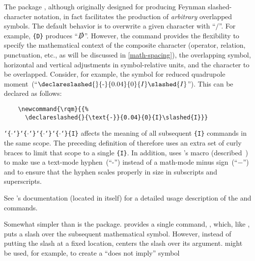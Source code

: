  
The  package \citep{slashed}, although originally designed for
producing Feynman
slashed-character notation, in fact
facilitates the production of \emph{arbitrary} overlapped symbols.
\ifhaveslashed
  \newcommand{\rqm}{{\declareslashed{}{\text{-}}{0.04}{0}{I}\slashed{I}}}
  The default behavior is to overwrite a given character with ``$/$''.
  For example, \cmd{\slashed}\verb|{D}| produces ``$\slashed{D}$''.
  However, the \cmd{\declareslashed} command provides the flexibility
  to specify the mathematical context of the composite character
  (operator, relation, punctuation, etc., as will be discussed in
  \ref{math-spacing}), the overlapping symbol, horizontal and
  vertical adjustments in symbol-relative units, and the character to
  be overlapped.  Consider, for example, the symbol for reduced
  quadrupole moment~(``$\rqm$'').  This can be declared as follows:

\begin{verbatim}
    \newcommand{\rqm}{{%
      \declareslashed{}{\text{-}}{0.04}{0}{I}\slashed{I}}}
\end{verbatim}

  \noindent
  \newcommand{\curlyarg}{\texttt{\char`\{}$\cdot$\texttt{\char`\}}}%

  \cmd{\declareslashed}\curlyarg\curlyarg\curlyarg\curlyarg\verb|{I}|
  affects the meaning of all subsequent \cmd{\slashed}\verb|{I}|
  commands in the same scope.  The preceding definition of 
  therefore uses an extra set of curly braces to limit that scope to a
  single \cmd{\slashed}\verb|{I}|.  In addition,  uses
  's \cmd{\text} macro
  (described~) to make
  \cmd{\declareslashed} use a text-mode hyphen~(``-'') instead of a
  math-mode minus sign~(``$-$'') and to ensure that the hyphen scales
  properly in size in subscripts and superscripts.
\fi  

See 's documentation (located in
 itself) for a detailed usage description of the
\cmd{\slashed} and \cmd{\declareslashed} commands.

Somewhat simpler than  is the 
package.   provides a single command,
\cmd{\centernot}, which, like \cmd{\not}, puts a slash over the
subsequent mathematical symbol.  However, instead of putting the slash
at a fixed location, \cmd{\centernot} centers the slash over its
argument.  \cmd{\centernot} might be used, for example, to create a
``does not imply'' symbol%

